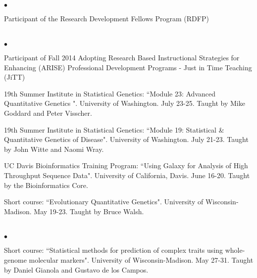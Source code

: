 \documentclass[margin,line,10pt]{res}
\newenvironment{list2}{
  \begin{list}{$\bullet$}{%
      \setlength{\itemsep}{0in}
      \setlength{\parsep}{0in} \setlength{\parskip}{0in}
      \setlength{\topsep}{0in} \setlength{\partopsep}{0in} 
      \setlength{\leftmargin}{0.2in}}}{\end{list}}
\begin{document}
\begin{resume}
\section{}
\begin{list2}
\item Participant of the Research Development Fellows Program (RDFP) 
\end{list2}

\section{}
\begin{list2}

\item Participant of Fall 2014 Adopting Research Based Instructional Strategies for Enhancing (ARISE) Professional Development Programs - Just in Time Teaching (JiTT)

\vspace{0.5cm}

\item 19th Summer Institute in Statistical Genetics: 
``Module 23: Advanced Quantitative Genetics ". University of Washington.  July 23-25.
Taught by Mike Goddard and Peter Visscher. 

\vspace{0.5cm}

\item 19th Summer Institute in Statistical Genetics: 
``Module 19: Statistical \& Quantitative Genetics of Disease". University of Washington. July 21-23.
Taught by John Witte and Naomi Wray. 

\vspace{0.5cm}

\item UC Davis Bioinformatics Training Program: 
``Using Galaxy for Analysis of High Throughput Sequence Data". University of California, Davis. June 16-20. 
Taught by the Bioinformatics Core. 

\vspace{0.5cm}

\item Short course: ``Evolutionary Quantitative Genetics". University of Wisconsin-Madison. May 19-23. 
Taught by Bruce Walsh. 

\end{list2}

\section{}
\begin{list2}
\item Short course: ``Statistical methods for prediction of complex traits using whole-genome molecular markers". University of Wisconsin-Madison. May 27-31. 
Taught by Daniel Gianola and Gustavo de los Campos.
\end{list2}  


\end{resume}
\end{document}

